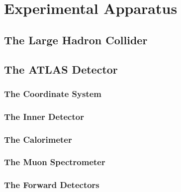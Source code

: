 \documentclass[10pt,twoside,cucitura,classica,english,openany]{toptesi}
\begin{document}


\chapter{Experimental Apparatus}
\label{cha:exper-appar}

\section{The Large Hadron Collider}
\label{sec:large-hadr-coll}



\section{The ATLAS Detector}
\label{sec:atlas-detector}



\subsection{The Coordinate System}
\label{sec:coordinate-system}



\subsection{The Inner Detector}
\label{sec:inner-detector}



\subsection{The Calorimeter}
\label{sec:calorimeters}



\subsection{The Muon Spectrometer}
\label{sec:muon-spectrometer}



\subsection{The Forward Detectors}
\label{sec:forward-detectors}


\end{document}
